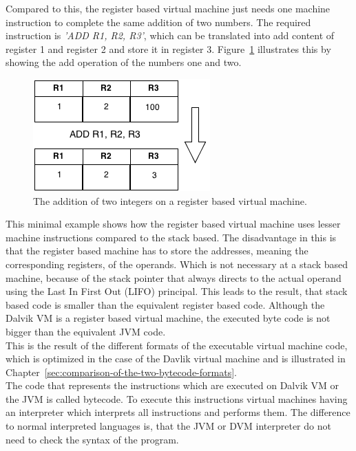 Compared to this, the register based virtual machine just needs one machine instruction to complete the same addition of two numbers.
The required instruction is \textit{'ADD R1, R2, R3'}, which can be translated into add content of register 1 and register 2 and store it in register 3.
Figure~\ref{fig:register-based-addition} illustrates this by showing the add operation of the numbers one and two.
\begin{figure}[h]
\begin{center}
\includegraphics[scale=0.65]{images/register-based-addition.png} 
\caption{The addition of two integers on a register based virtual machine.}
\label{fig:register-based-addition}
\end{center}
\end{figure}
This minimal example shows how the register based virtual machine uses lesser machine instructions compared to the stack based.
The disadvantage in this is that the register based machine has to store the addresses, meaning the corresponding registers, of the operands.
Which is not necessary at a stack based machine, because of the stack pointer that always directs to the actual operand using the Last In First Out (LIFO) principal.
This leads to the result, that stack based code is smaller than the equivalent register based code.
Although the Dalvik VM is a register based virtual machine, the executed byte code is not bigger than the equivalent JVM code.~\cite{shi2008virtual}\\
This is the result of the different formats of the executable virtual machine code, which is optimized in the case of the Davlik virtual machine and is illustrated in Chapter~\ref{sec:comparison-of-the-two-bytecode-formats}.
\\
The code that represents the instructions which are executed on Dalvik VM or the JVM is called bytecode.
To execute this instructions virtual machines having an interpreter which interprets all instructions and performs them.
The difference to normal interpreted languages is, that the JVM or DVM interpreter do not need to check the syntax of the program.
